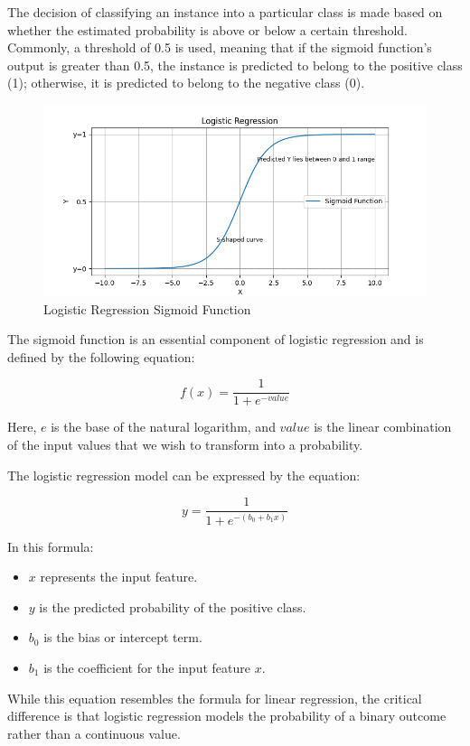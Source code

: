 \begin{enumerate}
The decision of classifying an instance into a particular class is made based on whether the estimated probability is above or below a certain threshold. Commonly, a threshold of 0.5 is used, meaning that if the sigmoid function's output is greater than 0.5, the instance is predicted to belong to the positive class (1); otherwise, it is predicted to belong to the negative class (0).
\begin{figure}[h]
	\centering
	\includegraphics[width=1\textwidth]{picture/LR1}
	\caption{Logistic Regression Sigmoid Function}
	\label{fig:logistic_regression}
\end{figure}

The sigmoid function is an essential component of logistic regression and is defined by the following equation:

\[ f(x) = \frac{1}{1 + e^{-value}} \]

Here, \( e \) is the base of the natural logarithm, and \( value \) is the linear combination of the input values that we wish to transform into a probability.

The logistic regression model can be expressed by the equation:

\[ y = \frac{1}{1 + e^{-(b_0 + b_1x)}} \]

In this formula:
\begin{itemize}
	\item \( x \) represents the input feature.
	\item \( y \) is the predicted probability of the positive class.
	\item \( b_0 \) is the bias or intercept term.
	\item \( b_1 \) is the coefficient for the input feature \( x \).
\end{itemize}

While this equation resembles the formula for linear regression, the critical difference is that logistic regression models the probability of a binary outcome rather than a continuous value.


\end{enumerate}

